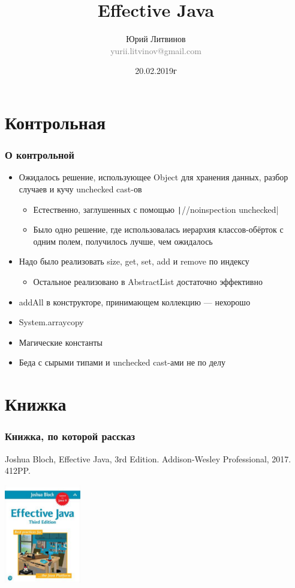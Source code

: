 \documentclass[xetex,mathserif,serif]{beamer}
\title{Effective Java}
\author[Юрий Литвинов]{Юрий Литвинов\\\small{\textcolor{gray}{yurii.litvinov@gmail.com}}}
\date{20.02.2019г}
\begin{document}
	\frame{\titlepage}

	\section{Контрольная}

	\begin{frame}
		\frametitle{О контрольной}
		\begin{itemize}
			\item Ожидалось решение, использующее Object для хранения данных, разбор случаев и кучу unchecked cast-ов
			\begin{itemize}
				\item Естественно, заглушенных с помощью \texttt|//noinspection unchecked|
				\item Было одно решение, где использовалась иерархия классов-обёрток с одним полем, получилось лучше, чем ожидалось
			\end{itemize}
			\item Надо было реализовать size, get, set, add и remove по индексу
			\begin{itemize}
				\item Остальное реализовано в AbstractList достаточно эффективно
			\end{itemize}
			\item addAll в конструкторе, принимающем коллекцию --- нехорошо
			\item System.arraycopy
			\item Магические константы
			\item Беда с сырыми типами и unchecked cast-ами не по делу
		\end{itemize}
	\end{frame}

	\section{Книжка}

	\begin{frame}
		\frametitle{Книжка, по которой рассказ}
		Joshua Bloch, Effective Java, 3rd Edition. Addison-Wesley Professional, 2017. 412PP.
		\begin{center}
			\includegraphics[width=0.25\textwidth]{bookCover.png}
		\end{center}
	\end{frame}
\end{document}
